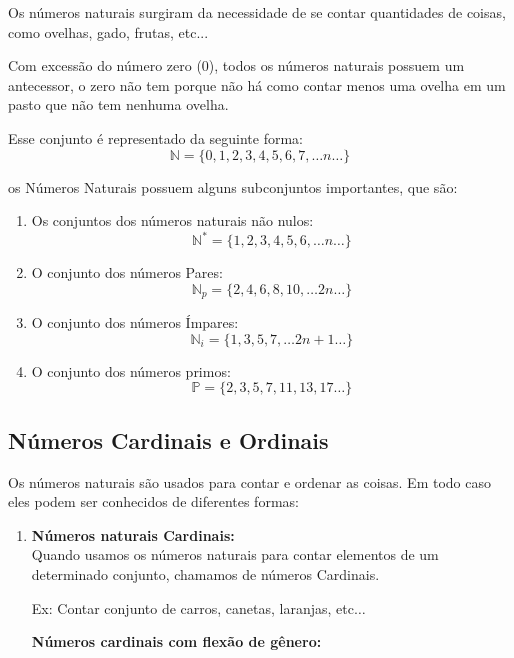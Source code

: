 \begin{multicols*}{2}
	Os números naturais surgiram da necessidade de se contar quantidades de coisas, como ovelhas, gado, frutas, etc...

	Com excessão do número zero (0), todos os números naturais possuem um antecessor, o zero não tem porque não há como contar menos uma ovelha em um pasto que não tem nenhuma ovelha.

	Esse conjunto é representado da seguinte forma:
	\[\mathbb{N} = \{{0, 1, 2, 3, 4, 5, 6, 7, \dots n \dots\}}\]

	os Números Naturais possuem alguns subconjuntos importantes, que são:

	\begin{enumerate}

		\item Os conjuntos dos números naturais não nulos:
		      \[\mathbb{N}^* = \{{ 1, 2, 3, 4, 5, 6, \dots n \dots\}}\]

		\item O conjunto dos números Pares:
		      \[\mathbb{N}_p = \{{ 2, 4, 6, 8, 10, \dots 2n \dots\}}\]

		\item O conjunto dos números Ímpares:
		      \[\mathbb{N}_i = \{{ 1, 3, 5, 7,  \dots 2n+1 \dots\}}\]

		\item O conjunto dos números primos:
		      \[\mathbb{P} = \{{ 2, 3, 5, 7, 11, 13, 17 \dots \}}\]

	\end{enumerate}

	\subsection*{Números Cardinais e Ordinais}

	Os números naturais são usados para contar e ordenar as coisas. Em todo caso eles podem ser conhecidos de diferentes formas:

	\begin{enumerate}

		\item \textbf{Números naturais Cardinais:}\\

		      Quando usamos os números naturais para contar elementos de um determinado conjunto, chamamos de números Cardinais.

		      Ex:  Contar conjunto de carros, canetas, laranjas, etc$\dots$

		      \textbf{Números cardinais com flexão de gênero:}


\end{enumerate}
\end{multicols*}
